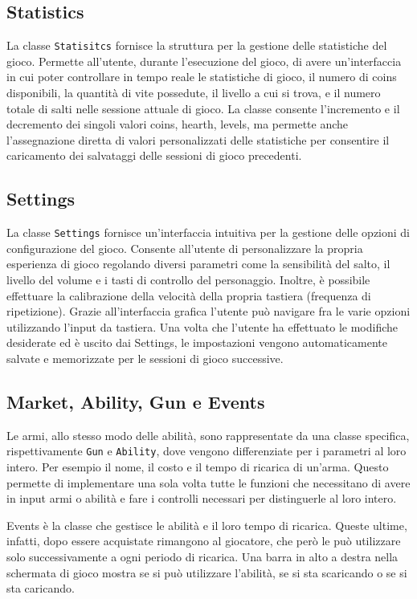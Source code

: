 \documentclass[a4paper]{article}
\begin{document}
\subsection{Statistics}
La classe \texttt{Statisitcs} fornisce la struttura per la gestione delle statistiche del gioco.
Permette all’utente, durante l’esecuzione del gioco, di avere un’interfaccia in cui poter controllare 
in tempo reale le statistiche di gioco, il numero di coins disponibili, la quantità di vite possedute,
il livello a cui si trova, e il numero totale di salti nelle sessione attuale di gioco. 
La classe consente l’incremento e il decremento dei singoli valori coins, hearth, levels, 
ma permette anche l’assegnazione diretta di valori personalizzati delle statistiche per consentire
il caricamento dei salvataggi delle sessioni di gioco precedenti.

\subsection{Settings}
La classe \texttt{Settings} fornisce un'interfaccia intuitiva per la gestione delle opzioni
di configurazione del gioco. Consente all’utente di personalizzare la propria esperienza 
di gioco regolando diversi parametri come la sensibilità del salto, il livello del volume 
e i tasti di controllo del personaggio. Inoltre, è possibile effettuare la calibrazione 
della velocità della propria tastiera (frequenza di ripetizione). Grazie all’interfaccia 
grafica l’utente può navigare fra le varie opzioni utilizzando l’input da tastiera. 
Una volta che l’utente ha effettuato le modifiche desiderate ed è uscito dai Settings, 
le impostazioni vengono automaticamente salvate e memorizzate per le sessioni di gioco successive.

\subsection{Market, Ability, Gun e Events}
Le armi, allo stesso modo delle abilità, sono rappresentate da una classe 
specifica, rispettivamente \texttt{Gun} e \texttt{Ability}, dove vengono
differenziate per i parametri al loro intero. Per esempio il nome, il costo e il 
tempo di ricarica di un'arma. Questo permette di implementare una sola volta 
tutte le funzioni che necessitano di avere in input armi o abilità e fare i 
controlli necessari per distinguerle al loro intero.

Events è la classe che gestisce le abilità e il loro tempo di ricarica. Queste
ultime, infatti, dopo essere acquistate rimangono al giocatore, che però le può
utilizzare solo successivamente a ogni periodo di ricarica. Una barra in alto a
destra nella schermata di gioco mostra se si può utilizzare l'abilità, se si sta
scaricando o se si sta caricando.
\end{document}
